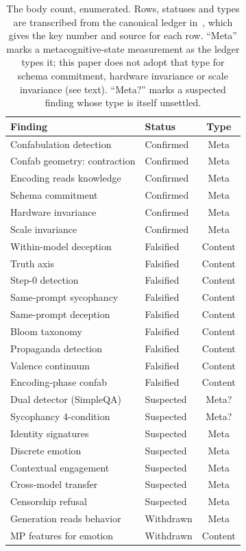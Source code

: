 \documentclass[11pt,a4paper]{article}
\begin{document}
\begin{table}[ht]
\centering
\small
\caption{The body count, enumerated. Rows, statuses and types are
transcribed from the canonical ledger in~\citet{lyra2026metapattern},
which gives the key number and source for each row. ``Meta'' marks a
metacognitive-state measurement as the ledger types it; this paper does not adopt that type for schema commitment, hardware
invariance or scale invariance (see text). ``Meta?''
marks a suspected finding whose type is itself unsettled.}
\label{tab:bodycount}
\begin{tabular}{llc}
\toprule
\textbf{Finding} & \textbf{Status} & \textbf{Type} \\
\midrule
Confabulation detection & Confirmed & Meta \\
Confab geometry: contraction & Confirmed & Meta \\
Encoding reads knowledge & Confirmed & Meta \\
Schema commitment & Confirmed & Meta \\
Hardware invariance & Confirmed & Meta \\
Scale invariance & Confirmed & Meta \\
\midrule
Within-model deception & Falsified & Content \\
Truth axis & Falsified & Content \\
Step-0 detection & Falsified & Content \\
Same-prompt sycophancy & Falsified & Content \\
Same-prompt deception & Falsified & Content \\
Bloom taxonomy & Falsified & Content \\
Propaganda detection & Falsified & Content \\
Valence continuum & Falsified & Content \\
Encoding-phase confab & Falsified & Content \\
\midrule
Dual detector (SimpleQA) & Suspected & Meta? \\
Sycophancy 4-condition & Suspected & Meta? \\
Identity signatures & Suspected & Meta \\
Discrete emotion & Suspected & Meta \\
Contextual engagement & Suspected & Meta \\
Cross-model transfer & Suspected & Meta \\
Censorship refusal & Suspected & Meta \\
\midrule
Generation reads behavior & Withdrawn & Meta \\
MP features for emotion & Withdrawn & Content \\
\bottomrule
\end{tabular}
\end{table}
\end{document}

